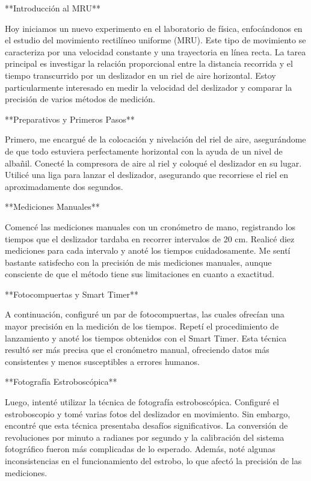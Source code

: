 \documentclass[journal]{IEEEtran}
\begin{document}
**Introducción al MRU**

Hoy iniciamos un nuevo experimento en el laboratorio de física, enfocándonos en el estudio del movimiento rectilíneo uniforme (MRU). Este tipo de movimiento se caracteriza por una velocidad constante y una trayectoria en línea recta. La tarea principal es investigar la relación proporcional entre la distancia recorrida y el tiempo transcurrido por un deslizador en un riel de aire horizontal. Estoy particularmente interesado en medir la velocidad del deslizador y comparar la precisión de varios métodos de medición.

**Preparativos y Primeros Pasos**

Primero, me encargué de la colocación y nivelación del riel de aire, asegurándome de que todo estuviera perfectamente horizontal con la ayuda de un nivel de albañil. Conecté la compresora de aire al riel y coloqué el deslizador en su lugar. Utilicé una liga para lanzar el deslizador, asegurando que recorriese el riel en aproximadamente dos segundos.

**Mediciones Manuales**

Comencé las mediciones manuales con un cronómetro de mano, registrando los tiempos que el deslizador tardaba en recorrer intervalos de 20 cm. Realicé diez mediciones para cada intervalo y anoté los tiempos cuidadosamente. Me sentí bastante satisfecho con la precisión de mis mediciones manuales, aunque consciente de que el método tiene sus limitaciones en cuanto a exactitud.

**Fotocompuertas y Smart Timer**

A continuación, configuré un par de fotocompuertas, las cuales ofrecían una mayor precisión en la medición de los tiempos. Repetí el procedimiento de lanzamiento y anoté los tiempos obtenidos con el Smart Timer. Esta técnica resultó ser más precisa que el cronómetro manual, ofreciendo datos más consistentes y menos susceptibles a errores humanos.

**Fotografía Estroboscópica**

Luego, intenté utilizar la técnica de fotografía estroboscópica. Configuré el estroboscopio y tomé varias fotos del deslizador en movimiento. Sin embargo, encontré que esta técnica presentaba desafíos significativos. La conversión de revoluciones por minuto a radianes por segundo y la calibración del sistema fotográfico fueron más complicadas de lo esperado. Además, noté algunas inconsistencias en el funcionamiento del estrobo, lo que afectó la precisión de las mediciones.
\end{document}
